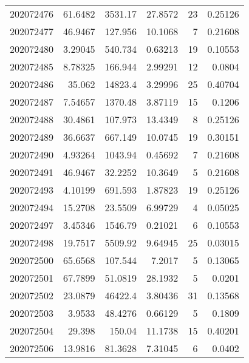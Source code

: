\begin{tabular}{rrrrrr}
 202072476 &         61.6482  &     3531.17   &           27.8572  &          23 & 0.25126 \\
 202072477 &         46.9467  &      127.956  &           10.1068  &           7 & 0.21608 \\
 202072480 &          3.29045 &      540.734  &            0.63213 &          19 & 0.10553 \\
 202072485 &          8.78325 &      166.944  &            2.99291 &          12 & 0.0804  \\
 202072486 &         35.062   &    14823.4    &            3.29996 &          25 & 0.40704 \\
 202072487 &          7.54657 &     1370.48   &            3.87119 &          15 & 0.1206  \\
 202072488 &         30.4861  &      107.973  &           13.4349  &           8 & 0.25126 \\
 202072489 &         36.6637  &      667.149  &           10.0745  &          19 & 0.30151 \\
 202072490 &          4.93264 &     1043.94   &            0.45692 &           7 & 0.21608 \\
 202072491 &         46.9467  &       32.2252 &           10.3649  &           5 & 0.21608 \\
 202072493 &          4.10199 &      691.593  &            1.87823 &          19 & 0.25126 \\
 202072494 &         15.2708  &       23.5509 &            6.99729 &           4 & 0.05025 \\
 202072497 &          3.45346 &     1546.79   &            0.21021 &           6 & 0.10553 \\
 202072498 &         19.7517  &     5509.92   &            9.64945 &          25 & 0.03015 \\
 202072500 &         65.6568  &      107.544  &            7.2017  &           5 & 0.13065 \\
 202072501 &         67.7899  &       51.0819 &           28.1932  &           5 & 0.0201  \\
 202072502 &         23.0879  &    46422.4    &            3.80436 &          31 & 0.13568 \\
 202072503 &          3.9533  &       48.4276 &            0.66129 &           5 & 0.1809  \\
 202072504 &         29.398   &      150.04   &           11.1738  &          15 & 0.40201 \\
 202072506 &         13.9816  &       81.3628 &            7.31045 &           6 & 0.0402  \\

\end{tabular}
